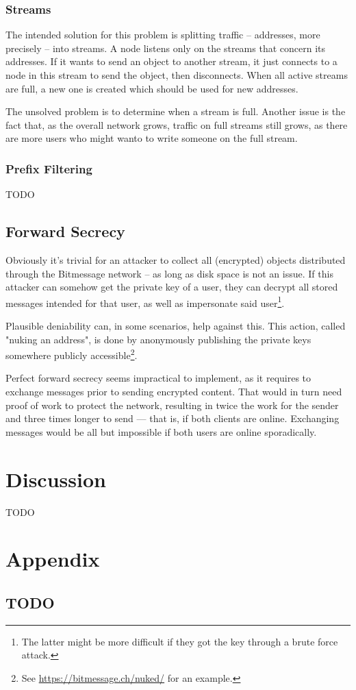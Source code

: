 \documentclass{bfh}
\begin{document}
  \subsubsection{Streams}
  The intended solution for this problem is splitting traffic -- addresses, more precisely -- into streams. A node listens only on the streams that concern its addresses. If it wants to send an object to another stream, it just connects to a node in this stream to send the object, then disconnects. When all active streams are full, a new one is created which should be used for new addresses.

  The unsolved problem is to determine when a stream is full. Another issue is the fact that, as the overall network grows, traffic on full streams still grows, as there are more users who might wanto to write someone on the full stream.

  \subsubsection{Prefix Filtering}
  TODO\cite{wiki:prefixfilter}

  \subsection{Forward Secrecy}

  Obviously it's trivial for an attacker to collect all (encrypted) objects distributed through the Bitmessage network -- as long as disk space is not an issue. If this attacker can somehow get the private key of a user, they can decrypt all stored messages intended for that user, as well as impersonate said user\footnote{The latter might be more difficult if they got the key through a brute force attack.}.

  Plausible deniability can, in some scenarios, help against this. This action, called "nuking an address", is done by anonymously publishing the private keys somewhere publicly accessible\footnote{See \url{https://bitmessage.ch/nuked/} for an example.}.

  Perfect forward secrecy seems impractical to implement, as it requires to exchange messages prior to sending encrypted content. That would in turn need proof of work to protect the network, resulting in twice the work for the sender and three times longer to send --- that is, if both clients are online. Exchanging messages would be all but impossible if both users are online sporadically.

  \section{Discussion}

  TODO


  
  

  \appendix
  \section*{Appendix}
  \renewcommand{\thesubsection}{\Alph{subsection}}

  \subsection{TODO}
\end{document}
